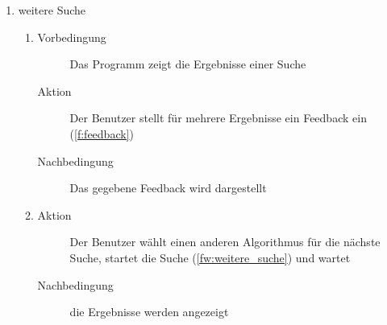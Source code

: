 \begin{enumerate} [label=\bfseries /TSW \arabic*0/, leftmargin=*]
\item weitere Suche \label{ts:weitere_suche}
	\begin{enumerate}[leftmargin=0pt]
		\item
		\begin{description}
			\item[Vorbedingung] Das Programm zeigt die Ergebnisse einer Suche
			\item[Aktion] Der Benutzer stellt für mehrere Ergebnisse ein \gls{Feedback} ein (\ref{f:feedback})
			\item[Nachbedingung] Das gegebene \gls{Feedback} wird dargestellt
		\end{description}
		\item
		\begin{description}
			\item[Aktion] Der Benutzer wählt einen anderen Algorithmus für die nächste Suche, startet die Suche (\ref{fw:weitere_suche}) und wartet
			\item[Nachbedingung] die Ergebnisse werden angezeigt
		\end{description}
	\end{enumerate}


\end{enumerate}
